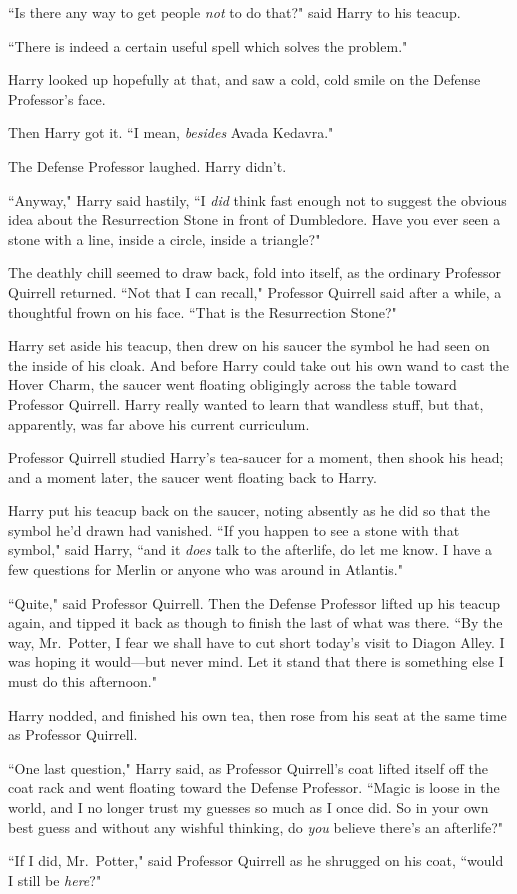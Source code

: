 ``Is there any way to get people \emph{not} to do that?" said Harry to his teacup.

``There is indeed a certain useful spell which solves the problem."

Harry looked up hopefully at that, and saw a cold, cold smile on the Defense Professor's face.

Then Harry got it. ``I mean, \emph{besides} Avada Kedavra."

The Defense Professor laughed. Harry didn't.

``Anyway," Harry said hastily, ``I \emph{did} think fast enough not to suggest the obvious idea about the Resurrection Stone in front of Dumbledore. Have you ever seen a stone with a line, inside a circle, inside a triangle?"

The deathly chill seemed to draw back, fold into itself, as the ordinary Professor Quirrell returned. ``Not that I can recall," Professor Quirrell said after a while, a thoughtful frown on his face. ``That is the Resurrection Stone?"

Harry set aside his teacup, then drew on his saucer the symbol he had seen on the inside of his cloak. And before Harry could take out his own wand to cast the Hover Charm, the saucer went floating obligingly across the table toward Professor Quirrell. Harry really wanted to learn that wandless stuff, but that, apparently, was far above his current curriculum.

Professor Quirrell studied Harry's tea-saucer for a moment, then shook his head; and a moment later, the saucer went floating back to Harry.

Harry put his teacup back on the saucer, noting absently as he did so that the symbol he'd drawn had vanished. ``If you happen to see a stone with that symbol," said Harry, ``and it \emph{does} talk to the afterlife, do let me know. I have a few questions for Merlin or anyone who was around in Atlantis."

``Quite," said Professor Quirrell. Then the Defense Professor lifted up his teacup again, and tipped it back as though to finish the last of what was there. ``By the way, Mr.~Potter, I fear we shall have to cut short today's visit to Diagon Alley. I was hoping it would---but never mind. Let it stand that there is something else I must do this afternoon."

Harry nodded, and finished his own tea, then rose from his seat at the same time as Professor Quirrell.

``One last question," Harry said, as Professor Quirrell's coat lifted itself off the coat rack and went floating toward the Defense Professor. ``Magic is loose in the world, and I no longer trust my guesses so much as I once did. So in your own best guess and without any wishful thinking, do \emph{you} believe there's an afterlife?"

``If I did, Mr.~Potter," said Professor Quirrell as he shrugged on his coat, ``would I still be \emph{here}?"

